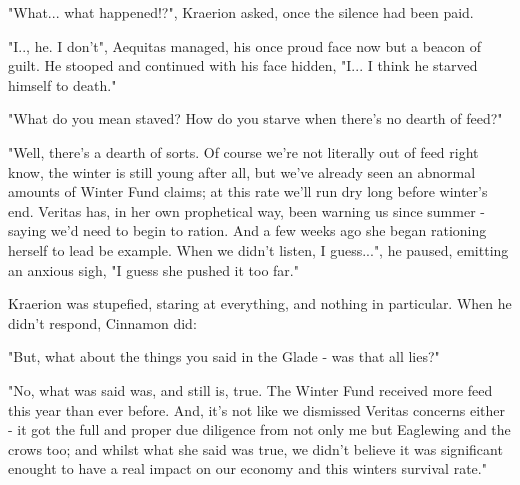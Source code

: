 

"What... what happened!?", Kraerion asked, once the silence had been paid.

"I.., he. I don't", Aequitas managed, his once proud face now but a beacon of guilt. He stooped and continued with his face hidden, "I... I think he starved himself to death."

"What do you mean staved? How do you starve when there's no dearth of feed?"

"Well, there's a dearth of sorts. Of course we're not literally out of feed right know, the winter is still young after all, but we've already seen an abnormal amounts of Winter Fund claims; at this rate we'll run dry long before winter's end. Veritas has, in her own prophetical way, been warning us since summer - saying we'd need to begin to ration. And a few weeks ago she began rationing herself to lead be example. When we didn't listen, I guess...", he paused, emitting an anxious sigh, "I guess she pushed it too far."

Kraerion was stupefied, staring at everything, and nothing in particular. When he didn't respond, Cinnamon did:

"But, what about the things you said in the Glade - was that all lies?"

"No, what was said was, and still is, true. The Winter Fund received more feed this year than ever before. And, it's not like we dismissed Veritas concerns either - it got the full and proper due diligence from not only me but Eaglewing and the crows too; and whilst what she said was true, we didn't believe it was significant enought to have a real impact on our economy and this winters survival rate."

